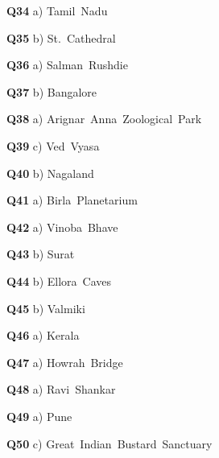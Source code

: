\textbf{Q34} a) Tamil Nadu\par
\textbf{Q35} b) St. Cathedral\par
\textbf{Q36} a) Salman Rushdie\par
\textbf{Q37} b) Bangalore\par
\textbf{Q38} a) Arignar Anna Zoological Park\par
\textbf{Q39} c) Ved Vyasa\par
\textbf{Q40} b) Nagaland\par
\textbf{Q41} a) Birla Planetarium\par
\textbf{Q42} a) Vinoba Bhave\par
\textbf{Q43} b) Surat\par
\textbf{Q44} b) Ellora Caves\par
\textbf{Q45} b) Valmiki\par
\textbf{Q46} a) Kerala\par
\textbf{Q47} a) Howrah Bridge\par
\textbf{Q48} a) Ravi Shankar\par
\textbf{Q49} a) Pune\par
\textbf{Q50} c) Great Indian Bustard Sanctuary\par
